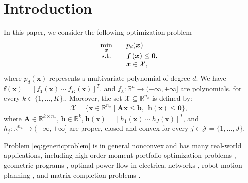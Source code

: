 \documentclass[opre,nonblindrev]{informs3} %
\begin{document}
	\maketitle



\section{Introduction}  
In this paper, we consider the following optimization problem 
\begin{equation}
    \begin{array}{cll}
        \displaystyle \min_{\boldsymbol{x}} &\quad p_d(\boldsymbol{x}) \\
        {\rm s.t.} 	&\quad  \boldsymbol{f} \left( \boldsymbol{x} \right) \le \boldsymbol{0}, \\ 
        &\quad \boldsymbol{x} \in \mathcal{X},
    \end{array} \label{eq:genericproblem}
\end{equation} 
where $p_d(\boldsymbol{x})$ represents a multivariate polynomial of degree $d$. {\color{black} We have $\boldsymbol{f} \left( \boldsymbol{x} \right) = [f_1(\boldsymbol{x}) \ \cdots \ f_K (\boldsymbol{x})]^T$, and $f_k: \mathbb{R}^{n} \rightarrow (-\infty, + \infty ]$ are polynomials, for every $k \in \{1,\ldots,K\}.$. Moreover, the set $\mathcal{X} \subseteq \mathbb{R}^{n_x}$ is defined by:
\begin{align*}
\mathcal{X} = \{ \boldsymbol{x} \in \mathbb{R}^{n_x} \mid \boldsymbol{A} \boldsymbol{x} \le \boldsymbol{b}, \: \: \boldsymbol{h} (\boldsymbol{x}) \le \boldsymbol{0} \},    
\end{align*}
where $\boldsymbol{A} \in \mathbb{R}^{k \times n_x}$, $\boldsymbol{b} \in \mathbb{R}^{k}$, $\boldsymbol{h} (\boldsymbol{x}) = [h_1(\boldsymbol{x})  \ \cdots \ h_J (\boldsymbol{x})]^T$, and $h_j: \mathbb{R}^{n_x} \rightarrow (-\infty, + \infty ]$ are proper, closed and convex for every $j \in \mathcal{J} = \{1,\ldots,J\}$.}

Problem \eqref{eq:genericproblem} is in general nonconvex and has many real-world applications, including high-order moment portfolio optimization problems \cite{niu2019high, pham2011efficient}, geometric programs \cite{boyd2007tutorial}, optimal power flow in electrical networks \cite{lavaei2011zero}, robot motion planning \cite{majumdar2014control}, and matrix completion problems \cite{bakonyi1995euclidian}.
\end{document}
